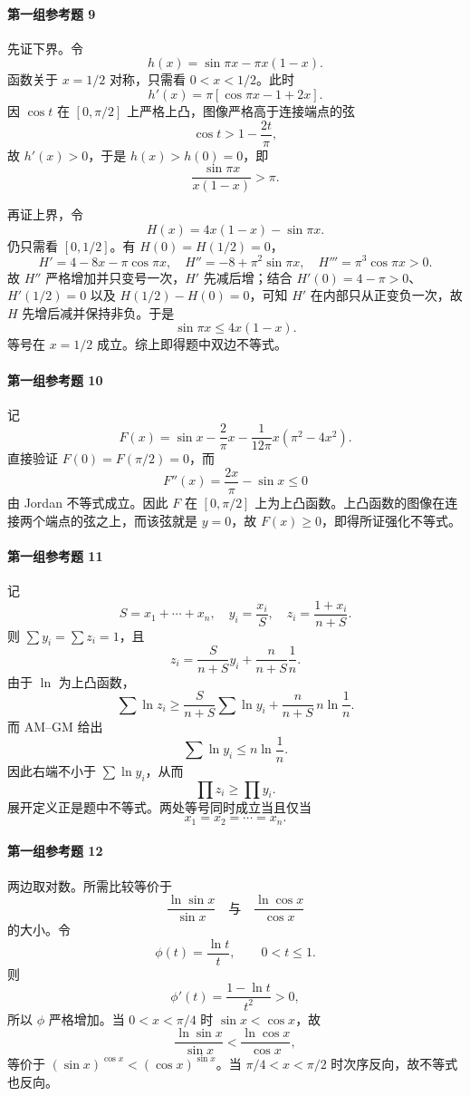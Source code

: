 \paragraph{第一组参考题 9}
\begin{xsolution}
先证下界。令
\[
  h(x)=\sin\pi x-\pi x(1-x).
\]
函数关于 $x=1/2$ 对称，只需看 $0<x<1/2$。此时
\[
  h'(x)=\pi[\cos\pi x-1+2x].
\]
因 $\cos t$ 在 $[0,\pi/2]$ 上严格上凸，图像严格高于连接端点的弦
\[
  \cos t>1-\frac{2t}{\pi},
\]
故 $h'(x)>0$，于是 $h(x)>h(0)=0$，即
\[
  \frac{\sin\pi x}{x(1-x)}>\pi.
\]

再证上界，令
\[
  H(x)=4x(1-x)-\sin\pi x.
\]
仍只需看 $[0,1/2]$。有 $H(0)=H(1/2)=0$，
\[
  H'=4-8x-\pi\cos\pi x,
  \quad H''=-8+\pi^2\sin\pi x,
  \quad H'''=\pi^3\cos\pi x>0.
\]
故 $H''$ 严格增加并只变号一次，$H'$ 先减后增；结合 $H'(0)=4-\pi>0$、$H'(1/2)=0$ 以及 $H(1/2)-H(0)=0$，可知 $H'$ 在内部只从正变负一次，故 $H$ 先增后减并保持非负。于是
\[
  \sin\pi x\le4x(1-x).
\]
等号在 $x=1/2$ 成立。综上即得题中双边不等式。
\end{xsolution}

\paragraph{第一组参考题 10}
\begin{xsolution}
记
\[
  F(x)=\sin x-\frac2\pi x-\frac1{12\pi}x(\pi^2-4x^2).
\]
直接验证 $F(0)=F(\pi/2)=0$，而
\[
  F''(x)=\frac{2x}{\pi}-\sin x\le0
\]
由 Jordan 不等式成立。因此 $F$ 在 $[0,\pi/2]$ 上为上凸函数。上凸函数的图像在连接两个端点的弦之上，而该弦就是 $y=0$，故 $F(x)\ge0$，即得所证强化不等式。
\end{xsolution}

\paragraph{第一组参考题 11}
\begin{xsolution}
记
\[
  S=x_1+\cdots+x_n,
  \quad y_i=\frac{x_i}{S},
  \quad z_i=\frac{1+x_i}{n+S}.
\]
则 $\sum y_i=\sum z_i=1$，且
\[
  z_i=\frac{S}{n+S}y_i+\frac{n}{n+S}\frac1n.
\]
由于 $\ln$ 为上凸函数，
\[
  \sum\ln z_i
  \ge\frac{S}{n+S}\sum\ln y_i
   +\frac{n}{n+S}\,n\ln\frac1n.
\]
而 AM--GM 给出
\[
  \sum\ln y_i\le n\ln\frac1n.
\]
因此右端不小于 $\sum\ln y_i$，从而
\[
  \prod z_i\ge\prod y_i.
\]
展开定义正是题中不等式。两处等号同时成立当且仅当
\[
  x_1=x_2=\cdots=x_n.
\]
\end{xsolution}

\paragraph{第一组参考题 12}
\begin{xsolution}
两边取对数。所需比较等价于
\[
  \frac{\ln\sin x}{\sin x}
  \quad\text{与}\quad
  \frac{\ln\cos x}{\cos x}
\]
的大小。令
\[
  \phi(t)=\frac{\ln t}{t},\qquad0<t\le1.
\]
则
\[
  \phi'(t)=\frac{1-\ln t}{t^2}>0,
\]
所以 $\phi$ 严格增加。当 $0<x<\pi/4$ 时 $\sin x<\cos x$，故
\[
  \frac{\ln\sin x}{\sin x}<\frac{\ln\cos x}{\cos x},
\]
等价于 $(\sin x)^{\cos x}<(\cos x)^{\sin x}$。当 $\pi/4<x<\pi/2$ 时次序反向，故不等式也反向。
\end{xsolution}

